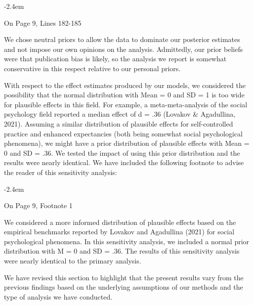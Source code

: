 \documentclass[final]{article}
\renewenvironment{quote}{\begin{fquote}\advance\leftmargini -2.4em\begin{oldquote}}{\end{oldquote}\end{fquote}}
\newenvironment{fquote}
  {\def\FrameCommand{
	\fboxsep=0.6em %
	\fcolorbox{black}{white}}%
    \MakeFramed {\advance\hsize-2\width \FrameRestore}
    \begin{minipage}{\linewidth}
  }
  {\end{minipage}\endMakeFramed}
\begin{document}
\begin{quote}
On Page 9, Lines 182-185

We chose neutral priors to allow the data to dominate our posterior estimates and not impose our own opinions on the analysis. Admittedly, our prior beliefs were that publication bias is likely, so the analysis we report is somewhat conservative in this respect relative to our personal priors.
\end{quote}

With respect to the effect estimates produced by our models, we considered the possibility that the normal distribution with Mean = 0 and SD = 1 is too wide for plausible effects in this field. For example, a meta-meta-analysis of the social psychology field reported a median effect of d = .36 (Lovakov \& Agadullina, 2021). Assuming a similar distribution of plausible effects for self-controlled practice and enhanced expectancies (both being somewhat social psychological phenomena), we might have a prior distribution of plausible effects with Mean = 0 and SD = .36. We tested the impact of using this prior distribution and the results were nearly identical. We have included the following footnote to advise the reader of this sensitivity analysis:

\begin{quote}
On Page 9, Footnote 1

We considered a more informed distribution of plausible effects based on the empirical benchmarks reported by Lovakov and Agadullina (2021) for social psychological phenomena. In this sensitivity analysis, we included a normal prior distribution with M = 0 and SD = .36. The results of this sensitivity analysis were nearly identical to the primary analysis.
\end{quote}


We have revised this section to highlight that the present results vary from the previous findings based on the underlying assumptions of our methods and the type of analysis we have conducted.
\end{document}
